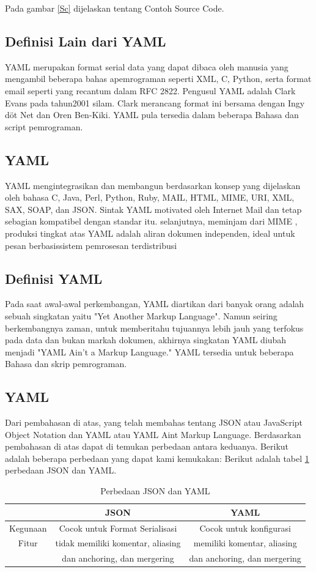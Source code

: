 \documentclass[a4paper]{article}
\begin{document}
Pada gambar \ref{Sc} dijelaskan tentang Contoh Source Code.

\subsection{Definisi Lain dari YAML}
YAML merupakan format serial data yang dapat dibaca oleh manusia yang mengambil beberapa bahas apemrograman seperti XML, C, Python, serta format email seperti yang recantum dalam RFC 2822. Pengusul YAML adalah Clark Evans pada tahun2001 silam. Clark merancang format ini bersama dengan Ingy döt Net dan Oren Ben-Kiki. YAML pula tersedia dalam beberapa Bahasa dan script pemrograman.
\subsection{YAML}
YAML mengintegrasikan dan membangun berdasarkan konsep yang dijelaskan oleh bahasa C, Java, Perl, Python, Ruby, MAIL,  HTML, MIME, URI, XML, SAX, SOAP, dan JSON.
Sintak YAML motivated oleh Internet Mail  dan tetap sebagian kompatibel dengan standar itu. selanjutnya, meminjam dari MIME , produksi tingkat atas YAML adalah aliran dokumen independen, ideal untuk pesan berbasissistem pemrosesan terdistribusi
\subsection{Definisi YAML}
Pada saat awal-awal perkembangan, YAML diartikan dari banyak orang adalah sebuah singkatan yaitu "Yet Another Markup Language". Namun seiring berkembangnya zaman, untuk memberitahu tujuannya lebih jauh yang terfokus pada data dan bukan markah dokumen, akhirnya singkatan YAML diubah menjadi "YAML Ain't a Markup Language." YAML tersedia untuk beberapa Bahasa dan skrip pemrograman.
\subsection{YAML}
Dari pembahasan di atas, yang telah membahas tentang JSON atau JavaScript Object Notation dan YAML atau YAML Aint Markup Language. Berdasarkan pembahasan di atas dapat di temukan perbedaan antara keduanya. Berikut adalah beberapa perbedaan yang dapat kami kemukakan:
Berikut adalah tabel \ref{table:perbedaan} perbedaan JSON dan YAML.
\begin{table}[h]
\caption{Perbedaan JSON dan YAML}

\centering
\begin{tabular}{ccc}
\hline
&JSON&YAML\\
\hline
Kegunaan&Cocok untuk Format Serialisasi&Cocok untuk konfigurasi\\
\hline
Fitur&tidak memiliki komentar, aliasing&memiliki komentar, aliasing \\
&dan anchoring, dan  mergering& dan anchoring, dan  mergering\\
\hline
\end{tabular}
\label{table:perbedaan}
\end{table}
\end{document}
